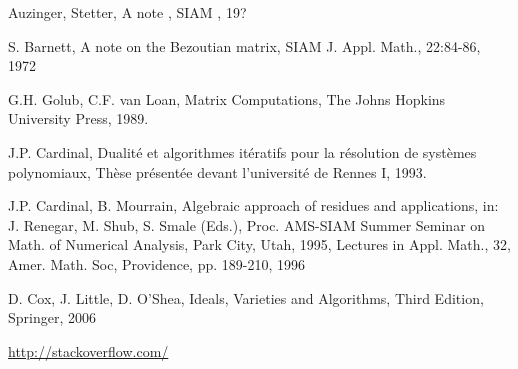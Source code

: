 \documentclass{standalone}
\begin{document}
  \begin{thebibliography}{00}

  {Auzinger, Stetter}, {A note }, {SIAM }, {19?}

  {S. Barnett}, {A note on the Bezoutian matrix}, {SIAM J. Appl. Math., 22:84-86}, {1972}

  {G.H. Golub, C.F. van Loan}, {Matrix Computations}, {The Johns Hopkins University Press}, {1989}.

  {J.P. Cardinal}, {Dualité et algorithmes itératifs pour la résolution de systèmes polynomiaux}, {Thèse présentée devant l'université de Rennes I}, {1993}.

  {J.P. Cardinal, B. Mourrain}, {Algebraic approach of residues and applications}, {in: J. Renegar, M. Shub, S. Smale (Eds.), Proc. AMS-SIAM Summer Seminar on Math. of Numerical Analysis, Park City, Utah, 1995, Lectures in Appl. Math., 32, Amer. Math. Soc, Providence, pp. 189-210}, {1996}

  {D. Cox, J. Little, D. O'Shea}, {Ideals, Varieties and Algorithms}, {Third Edition}, {Springer}, {2006}

  {\url{http://stackoverflow.com/}}


  \end{thebibliography}
\end{document}
